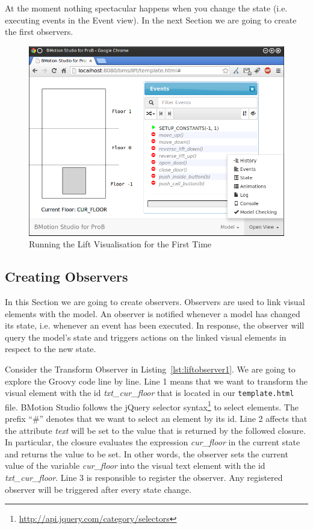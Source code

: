 At the moment nothing spectacular happens when you change the state (i.e. executing events in the Event view).
In the next Section we are going to create the first observers.

\begin{figure}[!ht]
\begin{center}
	\includegraphics[width=\textwidth]{img/tutorial/tut_03.png}
	\caption{Running the Lift Visualisation for the First Time}
	\label{fig_tut_03_running1}
\end{center}
\end{figure}

\subsection{Creating Observers}
\label{sec_creation_observers}

In this Section we are going to create observers.
Observers are used to link visual elements with the model. 
An observer is notified whenever a model has changed its state, i.e. whenever an event has been executed. 
In response, the observer will query the model's state and triggers actions on the linked visual elements in respect to the new state.

Consider the Transform Observer in Listing~\ref{lst:liftobserver1}.
We are going to explore the Groovy code line by line.
Line 1 means that we want to transform the visual element with the id \textit{txt\_cur\_floor} that is located in our \texttt{template.html} file.
BMotion Studio follows the jQuery selector syntax\footnote{\url{http://api.jquery.com/category/selectors}} to select elements.
The prefix ``\#'' denotes that we want to select an element by its id.
Line 2 affects that the attribute \textit{text} will be set to the value that is returned by the followed closure.
In particular, the closure evaluates the expression \textit{cur\_floor} in the current state and returns the value to be set.
In other words, the observer sets the current value of the variable \textit{cur\_floor} into the visual text element with the id \textit{txt\_cur\_floor}.
Line 3 is responsible to register the observer.
Any registered observer will be triggered after every state change.

